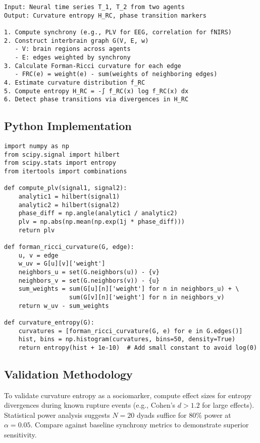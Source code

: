 \documentclass{article}
\theoremstyle{definition}
\begin{document}
\begin{verbatim}
Input: Neural time series T_1, T_2 from two agents
Output: Curvature entropy H_RC, phase transition markers

1. Compute synchrony (e.g., PLV for EEG, correlation for fNIRS)
2. Construct interbrain graph G(V, E, w)
   - V: brain regions across agents
   - E: edges weighted by synchrony
3. Calculate Forman-Ricci curvature for each edge
   - FRC(e) = weight(e) - sum(weights of neighboring edges)
4. Estimate curvature distribution f_RC
5. Compute entropy H_RC = -∫ f_RC(x) log f_RC(x) dx
6. Detect phase transitions via divergences in H_RC
\end{verbatim}

\subsection{Python Implementation}

\begin{verbatim}
import numpy as np
from scipy.signal import hilbert
from scipy.stats import entropy
from itertools import combinations

def compute_plv(signal1, signal2):
    analytic1 = hilbert(signal1)
    analytic2 = hilbert(signal2)
    phase_diff = np.angle(analytic1 / analytic2)
    plv = np.abs(np.mean(np.exp(1j * phase_diff)))
    return plv

def forman_ricci_curvature(G, edge):
    u, v = edge
    w_uv = G[u][v]['weight']
    neighbors_u = set(G.neighbors(u)) - {v}
    neighbors_v = set(G.neighbors(v)) - {u}
    sum_weights = sum(G[u][n]['weight'] for n in neighbors_u) + \
                  sum(G[v][n]['weight'] for n in neighbors_v)
    return w_uv - sum_weights

def curvature_entropy(G):
    curvatures = [forman_ricci_curvature(G, e) for e in G.edges()]
    hist, bins = np.histogram(curvatures, bins=50, density=True)
    return entropy(hist + 1e-10)  # Add small constant to avoid log(0)
\end{verbatim}

\subsection{Validation Methodology}

To validate curvature entropy as a sociomarker, compute effect sizes for entropy
divergences during known rupture events (e.g., Cohen's $d > 1.2$ for large
effects). Statistical power analysis suggests $N=20$ dyads suffice for 80\% power
at $\alpha=0.05$. Compare against baseline synchrony metrics to demonstrate
superior sensitivity.
\end{document}
